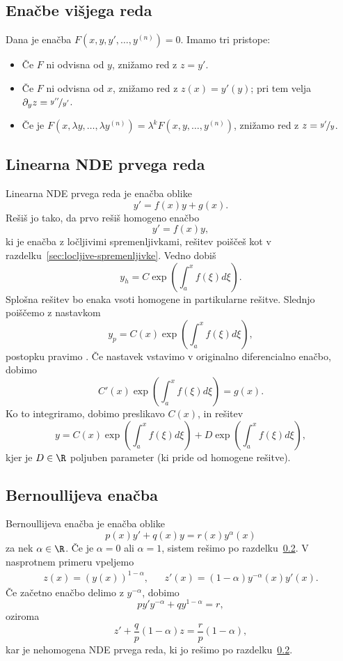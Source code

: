 \subsection{Enačbe višjega reda}%
\label{sec:enacbe-visjega-reda}

Dana je enačba $F(x, y, y', \ldots, y^{(n)}) = 0$.
Imamo tri pristope:
\begin{itemize}
\item Če $F$ ni odvisna od $y$, znižamo red z $z = y'$.
\item Če $F$ ni odvisna od $x$, znižamo red z $z(x) = y'(y)$; pri tem velja
  $\partial_y z = \nicefrac{y''}{y'}$.
\item Če je $F(x, \lambda y, \ldots, \lambda y^{(n)}) = \lambda^k F(x, y,
  \ldots, y^{(n)})$, znižamo red z $z = \nicefrac{y'}{y}$.
\end{itemize}

\subsection{Linearna NDE prvega reda}%
\label{sec:linearna-prvega-reda}

Linearna NDE prvega reda je enačba oblike
\[
  y' = f(x) y + g(x).
\]
Rešiš jo tako, da prvo rešiš homogeno enačbo
\[
  y' = f(x) y,
\]
ki je enačba z ločljivimi spremenljivkami, rešitev poiščeš kot v
razdelku~\ref{sec:locljive-spremenljivke}.
Vedno dobiš
\[
  y_h = C \exp\left( \int_a^x f(\xi) d\xi \right).
\]
Splošna rešitev bo enaka vsoti homogene in partikularne rešitve.
Slednjo poiščemo z nastavkom
\[
  y_p = C(x) \exp\left( \int_a^x f(\xi) d\xi \right),
\]
postopku pravimo .
Če nastavek vstavimo v originalno diferencialno enačbo, dobimo
\[
  C'(x) \exp\left(\int_a^x f(\xi) d\xi \right) = g(x).
\]
Ko to integriramo, dobimo preslikavo $C(x)$, in rešitev
\[
  y = C(x) \exp\left( \int_a^x f(\xi) d\xi \right)
  + D \exp\left( \int_a^x f(\xi) d\xi \right),
\]
kjer je $D \in \R$ poljuben parameter (ki pride od homogene rešitve).

\subsection{Bernoullijeva enačba}%
\label{sec:bernoullijeva-enaba}

Bernoullijeva enačba je enačba oblike
\[
  p(x) y' + q(x) y = r(x) y^\alpha(x)
\]
za nek $\alpha \in \R$.
Če je $\alpha = 0$ ali $\alpha = 1$, sistem rešimo po
razdelku~\ref{sec:linearna-prvega-reda}.
V nasprotnem primeru vpeljemo
\begin{align*}
  z(x) = {(y(x))}^{1 - \alpha}, && z'(x) = (1 - \alpha) y^{-\alpha}(x) y'(x).
\end{align*}
Če začetno enačbo delimo z $y^{-\alpha}$, dobimo
\[
  p y' y^{-\alpha} + q y^{1 - \alpha} = r,
\]
oziroma
\[
  z' + \frac{q}{p} (1 - \alpha) z = \frac{r}{p}(1 - \alpha),
\]
kar je nehomogena NDE prvega reda, ki jo rešimo po
razdelku~\ref{sec:linearna-prvega-reda}.

